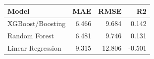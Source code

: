 \begin{tabular}{lrrr}
\toprule
Model & MAE & RMSE & R2 \\
\midrule
XGBoost/Boosting & 6.466 & 9.684 & 0.142 \\
Random Forest & 6.481 & 9.746 & 0.131 \\
Linear Regression & 9.315 & 12.806 & -0.501 \\
\bottomrule
\end{tabular}
